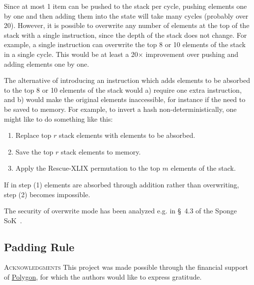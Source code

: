 \documentclass[a4paper]{article}
\begin{document}
Since at most 1 item can be pushed to the stack per cycle, pushing elements one by one and then adding them into the state will take many cycles (probably over 20). However, it is possible to overwrite any number of elements at the top of the stack with a single instruction, since the depth of the stack does not change. For example, a single instruction can overwrite the top 8 or 10 elements of the stack in a single cycle. This would be at least a 20$\times$ improvement over pushing and adding elements one by one.

The alternative of introducing an instruction which adds elements to be absorbed to the top 8 or 10 elements of the stack would a) require one extra instruction, and b) would make the original elements inaccessible, for instance if the need to be saved to memory. For example, to invert a hash non-deterministically, one might like to do something like this:

\begin{enumerate}

\item Replace top $r$ stack elements with elements to be absorbed.
\item Save the top $r$ stack elements to memory.
\item Apply the Rescue-XLIX permutation to the top $m$ elements of the stack.

\end{enumerate}

If in step (1) elements are absorbed through addition rather than overwriting, step (2) becomes impossible.

The security of overwrite mode has been analyzed e.g. in \S~4.3 of the Sponge SoK~\cite{sponge}.

\subsection{Padding Rule}

\vspace{0.25cm}
\textsc{Acknowledgments} This project was made possible through the financial support of \href{https://polygon.technology/}{Polygon}, for which the authors would like to express gratitude.




\end{document}
